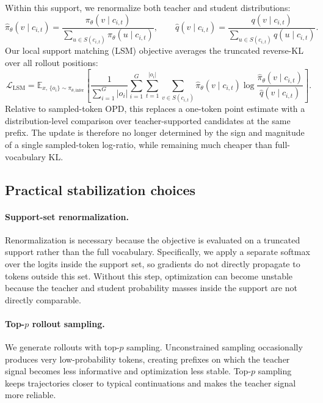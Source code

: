 \documentclass{article}
\begin{document}
Within this support, we renormalize both teacher and student distributions:
\begin{equation}
\hat \pi_\theta(v \mid c_{i,t})
=
\frac{\pi_\theta(v \mid c_{i,t})}{\sum_{u \in S(c_{i,t})}\pi_\theta(u \mid c_{i,t})},
\qquad
\hat q(v \mid c_{i,t})
=
\frac{q(v \mid c_{i,t})}{\sum_{u \in S(c_{i,t})}q(u \mid c_{i,t})}.
\label{eq:renorm}
\end{equation}
Our local support matching (LSM) objective averages the truncated reverse-KL over all rollout positions:
\begin{equation}
\mathcal{L}_{\mathrm{LSM}}
=
\mathbb{E}_{x,\, \{o_i\} \sim \pi_{\theta,\mathrm{infer}}}
\left[
\frac{1}{\sum_{i=1}^{G} |o_i|}
\sum_{i=1}^{G}
\sum_{t=1}^{|o_i|}
\sum_{v \in S(c_{i,t})}
\hat \pi_\theta(v \mid c_{i,t})
\log
\frac{\hat \pi_\theta(v \mid c_{i,t})}{\hat q(v \mid c_{i,t})}
\right].
\label{eq:lsm}
\end{equation}
Relative to sampled-token OPD, this replaces a one-token point estimate with a distribution-level comparison over teacher-supported candidates at the same prefix. The update is therefore no longer determined by the sign and magnitude of a single sampled-token log-ratio, while remaining much cheaper than full-vocabulary KL.

\subsection{Practical stabilization choices}
\label{subsec:practical}

\paragraph{Support-set renormalization.}
Renormalization is necessary because the objective is evaluated on a truncated support rather than the full vocabulary. Specifically, we apply a separate softmax over the logits inside the support set, so gradients do not directly propagate to tokens outside this set. Without this step, optimization can become unstable because the teacher and student probability masses inside the support are not directly comparable.

\paragraph{Top-$p$ rollout sampling.}
We generate rollouts with top-$p$ sampling.
Unconstrained sampling occasionally produces very low-probability tokens, creating prefixes on which the teacher signal becomes less informative and optimization less stable.
Top-$p$ sampling keeps trajectories closer to typical continuations and makes the teacher signal more reliable.
\end{document}
